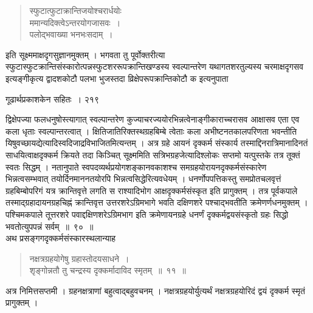 \documentclass[11pt, openany]{book}
\begin{document}

\begin{quote}
{\qt स्फुटात्फुटाक्रान्तिजयोश्चरार्धयोः \\
 ममान्यदिक्त्वेऽन्तरयोगजासवः~।\\ 
 पलोद्भवाख्या भनभःसदाम्~। }
 \end{quote}


इति सूक्ष्ममाक्षदृगसुज्ञानमुक्तम् । भगवता तु पूर्वोक्तरीत्या स्फुटास्फुटक्रान्तिसंस्कारोत्पन्नस्फुटशररूपक्रान्तिखण्डस्य स्वल्पान्तरेण यथागतशरतुल्यस्य चरमाक्षदृगसव इत्यङ्गीकृत्य द्वादशकोटौ पलभा भुजस्तदा व्रिक्षेपरूपक्रान्तिकोटौ क इत्यनुपाता \textendash


\newpage

\hspace{3cm} गूढार्थप्रकाशकेन सहितः~। \hfill २१९
\vspace{1cm}


\noindent द्विक्षेपज्या फलधनुषोस्त्यागात् स्वल्पान्तरेण कुज्याचरज्ययोरभिन्नत्वेनाङ्गीकाराच्चरासव आक्षासव एता एव कला धृताः स्वल्पान्तरत्वात् । क्षितिजातिरिक्तस्थग्रहबिम्बे त्वेताः कला अभीष्टनतकालपरिणता भवन्तीति यिषुवच्छायद्येत्यादिस्वदिजाद्रविभाजितमित्यन्तम् । अत्र ग्रहे आयनं दृक्कर्म संस्कार्य तस्माद्दिनरात्रिमानादिनतं साधयित्वाक्षदृक्कर्म क्रियते तदा किञ्चित् सूक्ष्ममिति सत्रिभग्रहजेत्यादिश्लोकः सप्तमो यत्पुस्तके तत्र तूक्तं स्वतः सिद्धम् । नतानुपाते स्वपदव्यर्थप्रयोगशङ्कानवकाशश्च समग्रहयोरायनदृक्कर्मसंस्कारेण भिन्नत्वसम्भवात् तयोर्दिनमाननतयोरपि भिन्नत्वसिद्धेरित्यवधेयम् । धनर्णोपपत्तिकस्तु समप्रोतचलवृत्तं ग्रहबिम्बोपरिगं यत्र क्रान्तिवृत्ते लगति स राश्यादिभोग आक्षदृक्कर्मसंस्कृत इति प्रागुक्तम् । तत्र पूर्वकपाले तस्माद्ग्रहादायनग्रहचिह्नं क्रान्तिवृत्त उत्तरशरेऽग्रिमभागे भवति दक्षिणशरे पश्चाद्भवतीति क्रमेणर्णधनमुक्तम् । पश्चिमकपाले तूत्तरशरे पवाद्दक्षिणशरेऽग्रिमभाग इति क्रमेणायनग्रहे धनर्णं दृक्कर्मद्वयसंस्कृतो ग्रहः सिद्धो भवतोत्युपपन्नं सर्वम्~॥~९०~॥\\
\noindent अथ प्रसङ्गगदृक्कर्मसंस्कारस्थलान्याह \textendash


\begin{quote}
{\ssi नक्षत्रग्रहयोगेषु ग्रहास्तोदयसाधने~।\\
 शृङ्गोन्नतौ तु चन्द्रस्य दृक्कर्मादाविद स्मृतम्~॥~११~॥ }
 \end{quote}


 अत्र निमित्तसप्तमी । ग्रहनक्षत्राणां बहुत्वाद्बहुवचनम् । नक्षत्रग्रहयोर्युत्यर्थं नक्षत्रग्रहयोरिदं द्वयं दृक्कर्म स्मृतं प्रागुक्तम् ।
\end{document}
